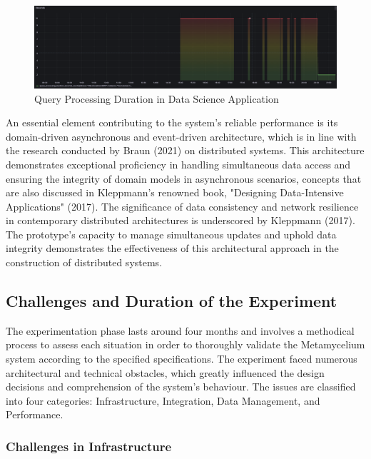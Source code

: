 \documentclass[journal]{IEEEtran}
\begin{document}
\begin{figure}[h]
  \centering
  \includegraphics[width=\textwidth]{images/query-processing-duration-in-data-science-application.png}
  \caption{Query Processing Duration in Data Science Application}
  \label{queryProcessingDurationInDataScienceApplication}
\end{figure}


An essential element contributing to the system's reliable performance is its domain-driven asynchronous and event-driven architecture, which is in line with the research conducted by Braun (2021) on distributed systems. This architecture demonstrates exceptional proficiency in handling simultaneous data access and ensuring the integrity of domain models in asynchronous scenarios, concepts that are also discussed in Kleppmann's renowned book, "Designing Data-Intensive Applications" (2017). The significance of data consistency and network resilience in contemporary distributed architectures is underscored by Kleppmann (2017). The prototype's capacity to manage simultaneous updates and uphold data integrity demonstrates the effectiveness of this architectural approach in the construction of distributed systems.


\subsection{Challenges and Duration of the Experiment}

The experimentation phase lasts around four months and involves a methodical process to assess each situation in order to thoroughly validate the Metamycelium system according to the specified specifications. The experiment faced numerous architectural and technical obstacles, which greatly influenced the design decisions and comprehension of the system's behaviour. The issues are classified into four categories: Infrastructure, Integration, Data Management, and Performance.

\subsubsection{Challenges in Infrastructure} 
\end{document}
